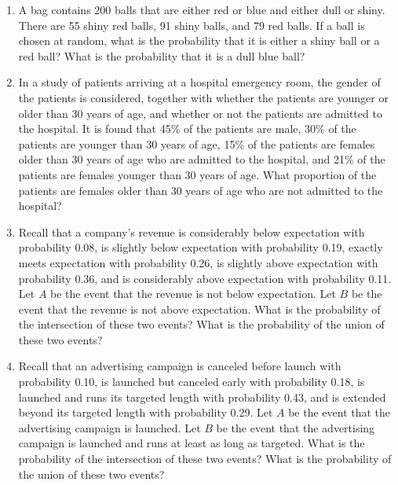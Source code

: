 \documentclass[10pt, twocolumn]{article}
\begin{document}
\begin{enumerate}
    \item[\textbf{1.3.12}] A bag contains 200 balls that are either red or blue and either dull or shiny. There are 55 shiny red balls, 91 shiny balls, and 79 red balls. If a ball is chosen at random, what is the probability that it is either a shiny ball or a red ball? What is the probability that it is a dull blue ball?

    \item[\textbf{1.3.13}] In a study of patients arriving at a hospital emergency room, the gender of the patients is considered, together with whether the patients are younger or older than 30 years of age, and whether or not the patients are admitted to the hospital. It is found that 45\% of the patients are male, 30\% of the patients are younger than 30 years of age, 15\% of the patients are females older than 30 years of age who are admitted to the hospital, and 21\% of the patients are females younger than 30 years of age. What proportion of the patients are females older than 30 years of age who are not admitted to the hospital?

    \item[\textbf{1.3.14}] Recall that a company's revenue is considerably below expectation with probability 0.08, is slightly below expectation with probability 0.19, exactly meets expectation with probability 0.26, is slightly above expectation with probability 0.36, and is considerably above expectation with probability 0.11. Let $A$ be the event that the revenue is not below expectation. Let $B$ be the event that the revenue is not above expectation. What is the probability of the intersection of these two events? What is the probability of the union of these two events?

    \item[\textbf{1.3.15}] Recall that an advertising campaign is canceled before launch with probability 0.10, is launched but canceled early with probability 0.18, is launched and runs its targeted length with probability 0.43, and is extended beyond its targeted length with probability 0.29. Let $A$ be the event that the advertising campaign is launched. Let $B$ be the event that the advertising campaign is launched and runs at least as long as targeted. What is the probability of the intersection of these two events? What is the probability of the union of these two events?
\end{enumerate}
\end{document}
